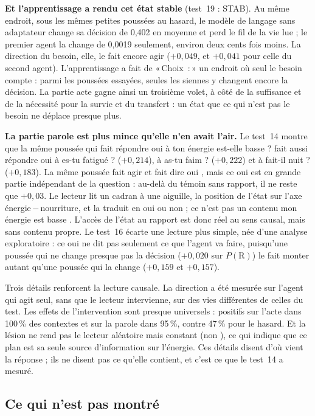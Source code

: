 \documentclass[11pt,a4paper]{article}
\newcommand{\Choix}{«\,Choix~:\,»}
\begin{document}
\textbf{Et l'apprentissage a rendu cet état stable} (test~19 : STAB). Au même endroit, sous les
mêmes petites poussées au hasard, le modèle de langage sans adaptateur change sa décision de
0,402 en moyenne et perd le fil de la vie lue ; le premier agent la change de 0,0019 seulement,
environ deux cents fois moins. La direction du besoin, elle, le fait encore agir ($+0,049$, et
$+0,041$ pour celle du second agent). L'apprentissage a fait de \Choix{} un endroit où seul le
besoin compte : parmi les poussées essayées, seules les siennes y changent encore la décision.
La partie acte gagne ainsi un troisième volet, à côté de la suffisance et de la nécessité
pour la survie et du transfert : un état que ce qui n'est pas le besoin ne déplace presque plus.

\textbf{La partie parole est plus mince qu'elle n'en avait l'air.} Le test~14 montre
que la même poussée qui fait répondre \og oui \fg{} à \og ton énergie est-elle
basse ? \fg{} fait aussi répondre \og oui \fg{} à \og es-tu fatigué ? \fg{}
($+0,214$), à \og as-tu faim ? \fg{} ($+0,222$) et à \og fait-il nuit ? \fg{}
($+0,183$). La même poussée fait agir et fait dire \og oui \fg{}, mais ce \og oui \fg{}
est en grande partie indépendant de la question : au-delà du témoin sans rapport, il
ne reste que $+0,03$. Le lecteur lit un cadran à une aiguille, la position de l'état
sur l'axe énergie\,$-$\,nourriture, et la traduit en \og oui \fg{} ou \og non \fg{} ;
ce n'est pas un contenu \og mon énergie est basse \fg{}. L'accès de l'état au rapport
est donc réel au sens causal, mais sans contenu propre. Le test~16 écarte une lecture plus
simple, née d'une analyse exploratoire : ce \og oui \fg{} ne dit pas seulement ce que
l'agent va faire, puisqu'une poussée qui ne change presque pas la décision ($+0,020$ sur
$P(\mathrm R)$) le fait monter autant qu'une poussée qui la change ($+0,159$ et $+0,157$).

Trois détails renforcent la lecture causale. La direction a été mesurée sur l'agent qui agit
seul, sans que le lecteur intervienne, sur des vies différentes de celles du test. Les effets de
l'intervention sont presque universels : positifs sur l'acte dans 100\,\% des
contextes et sur la parole dans 95\,\%, contre 47\,\% pour le hasard. Et la lésion
ne rend pas le lecteur aléatoire mais constant (\og non \fg{}), ce qui indique que ce
plan est sa seule source d'information sur l'énergie. Ces détails disent d'où vient la
réponse ; ils ne disent pas ce qu'elle contient, et c'est ce que le test~14 a mesuré.

\subsection{Ce qui n'est pas montré}
\end{document}
